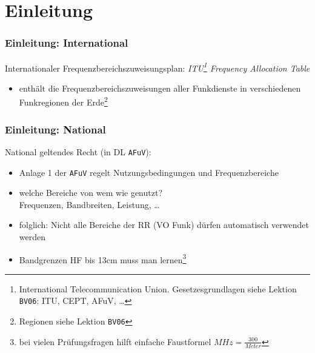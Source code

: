 

\subtitle{Betriebstechnik/Vorschriften 09: \\
  Betriebsarten, Sendearten, Frequenzen \\[2em]}
\date{Stand 18.09.2017}



\section{Einleitung}

\begin{frame}
  \frametitle{Einleitung: International}

  Internationaler Frequenzbereichszuweisungsplan:
  \emph{ITU\footnote{International Telecommunication Union.
  Gesetzesgrundlagen siehe Lektion \texttt{BV06}: ITU, CEPT, AFuV, \ldots} Frequency
  Allocation Table}

  \begin{itemize}
    \item enthält die Frequenzbereichszuweisungen aller Funkdienste in
      verschiedenen Funkregionen der Erde\footnote{Regionen siehe Lektion \texttt{BV06}}
  \end{itemize}

\end{frame}

\begin{frame}
  \frametitle{Einleitung: National}

  National geltendes Recht (in DL \texttt{AFuV}):

  \begin{itemize}
    \item Anlage 1 der \texttt{AFuV} regelt Nutzungsbedingungen und Frequenzbereiche
    \item welche Bereiche von wem wie genutzt? \\
      Frequenzen, Bandbreiten, Leistung, \ldots
    \item folglich: Nicht alle Bereiche der RR (VO Funk) dürfen automatisch
      verwendet werden
    \item Bandgrenzen HF bis 13cm muss man lernen\footnote{bei vielen
      Prüfungsfragen hilft einfache Faustformel $MHz = \frac{300}{Meter}$}
  \end{itemize}

\end{frame}

